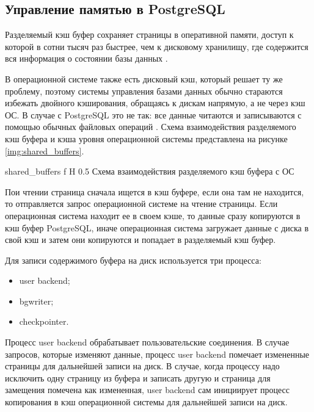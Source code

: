 \subsection{Управление памятью в PostgreSQL}

Разделяемый кэш буфер сохраняет страницы в оперативной памяти, доступ к которой в сотни тысяч раз быстрее, чем к дисковому хранилищу, где содержится вся информация о состоянии базы данных \cite{shaik2020postgresql}.

В операционной системе также есть дисковый кэш, который решает ту же проблему, поэтому системы управления базами данных обычно стараются избежать двойного кэширования, обращаясь к дискам напрямую, а не через кэш ОС. 
В случае с PostgreSQL это не так: все данные читаются и записываются с помощью обычных файловых операций \cite{rogov2023postgresql}.
Схема взаимодействия разделяемого кэш буфера и кэша уровня операционной системы представлена на рисунке \ref{img:shared_buffers}.

{shared_buffers} %
{f} %
{H} %
{0.5\textwidth} %
{Схема взаимодействия разделяемого кэш буфера с ОС} %

Пои чтении страница сначала ищется в кэш буфере, если она там не находится, то отправляется запрос операционной системе на чтение страницы.
Если операционная система находит ее в своем кэше, то данные сразу копируются в кэш буфер PostgreSQL, иначе операционная система загружает данные с диска в свой кэш и затем они копируются и попадает в разделяемый кэш буфер.

Для записи содержимого буфера на диск используется три процесса:
\begin{itemize}
	\item user backend;
	\item bgwriter;
	\item checkpointer.
\end{itemize}

Процесс user backend обрабатывает пользовательские соединения.
В случае запросов, которые изменяют данные, процесс user backend помечает измененные страницы для дальнейшей записи на диск.
В случае, когда процессу надо исключить одну страницу из буфера и записать другую и страница для замещения помечена как измененная, user backend сам инициирует процесс копирования в кэш операционной системы для дальнейшей записи на диск.

